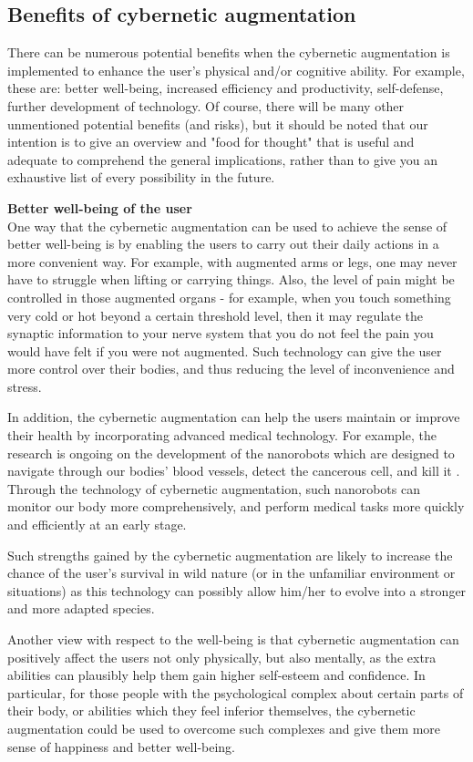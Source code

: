 \subsection{Benefits of cybernetic augmentation}

There can be numerous potential benefits when the cybernetic augmentation is implemented to enhance the user's physical and/or cognitive ability. For example, these are: better well-being, increased efficiency and productivity, self-defense, further development of technology. Of course, there will be many other unmentioned potential benefits (and risks), but it should be noted that our intention is to give an overview and "food for thought" that is useful and adequate to comprehend the general implications, rather than to give you an exhaustive list of every possibility in the future. 


{\bf Better well-being of the user} \\
One way that the cybernetic augmentation can be used to achieve the sense of better well-being is by enabling the users to carry out their daily actions in a more convenient way. For example, with augmented arms or legs, one may never have to struggle when lifting or carrying things. Also, the level of pain might be controlled in those augmented organs - for example, when you touch something very cold or hot beyond a certain threshold level, then it may regulate the synaptic information to your nerve system that you do not feel the pain you would have felt if you were not augmented. Such technology can give the user more control over their bodies, and thus reducing the level of inconvenience and stress.

In addition, the cybernetic augmentation can help the users maintain or improve their health by incorporating advanced medical technology. For example, the research is ongoing on the development of the nanorobots which are designed to navigate through our bodies' blood vessels, detect the cancerous cell, and kill it \cite{nanorobot}. Through the technology of cybernetic augmentation, such nanorobots can monitor our body more comprehensively, and perform medical tasks more quickly and efficiently at an early stage. 

Such strengths gained by the cybernetic augmentation are likely to increase the chance of the user's survival in wild nature (or in the unfamiliar environment or situations) as this technology can possibly allow him/her to evolve into a stronger and more adapted species. 

Another view with respect to the well-being is that cybernetic augmentation can positively affect the users not only physically, but also mentally, as the extra abilities can plausibly help them gain higher self-esteem and confidence. In particular, for those people with the psychological complex about certain parts of their body, or abilities which they feel inferior themselves, the cybernetic augmentation could be used to overcome such complexes and give them more sense of happiness and better well-being.


